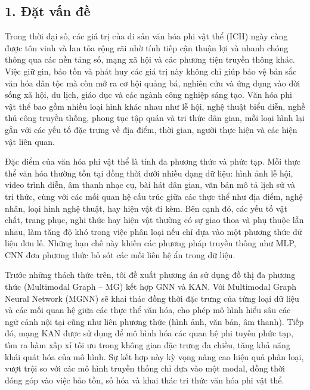 \subsection{1. Đặt vấn đề}

\indent\indent Trong thời đại số, các giá trị của di sản văn hóa phi vật thể (ICH) ngày càng được tôn vinh và lan tỏa rộng rãi nhờ tính tiếp cận thuận lợi và nhanh chóng thông qua các nền tảng số, mạng xã hội và các phương tiện truyền thông khác. Việc giữ gìn, bảo tồn và phát huy các giá trị này không chỉ giúp bảo vệ bản sắc văn hóa dân tộc mà còn mở ra cơ hội quảng bá, 
nghiên cứu và ứng dụng vào đời sống xã hội, du lịch, giáo dục và các ngành công nghiệp sáng tạo. Văn hóa phi vật thể bao gồm nhiều loại hình khác nhau như lễ hội, nghệ thuật biểu diễn, nghề thủ công truyền thống, phong tục tập quán và tri thức dân gian, mỗi loại hình lại gắn với các yếu tố đặc trưng về địa điểm, thời gian, người thực hiện và các hiện vật liên quan.\vspace{0.3cm}

Đặc điểm của văn hóa phi vật thể là tính đa phương thức và phức tạp. Mỗi thực thể văn hóa thường tồn tại đồng thời dưới nhiều dạng dữ liệu: hình ảnh lễ hội, video trình diễn, âm thanh nhạc cụ, bài hát dân gian, văn bản mô tả lịch sử và tri thức, cùng với các mối quan hệ cấu trúc giữa các thực thể như địa điểm, nghệ nhân, loại hình nghệ thuật, hay hiện vật đi kèm. 
Bên cạnh đó, các yếu tố vật chất, trang phục, nghi thức hay hiện vật thường có sự giao thoa và phụ thuộc lẫn nhau, làm tăng độ khó trong việc phân loại nếu chỉ dựa vào một phương thức dữ liệu đơn lẻ. Những hạn chế này khiến các phương pháp truyền thống như MLP, CNN đơn phương thức bỏ sót các mối liên hệ ẩn trong dữ liệu.
\vspace{0.3cm}

Trước những thách thức trên, tôi đề xuất phương án sử dụng đồ thị đa phương thức (Multimodal Graph -- MG) kết hợp GNN và KAN. Với Multimodal Graph Neural Network (MGNN) sẽ khai thác đồng thời đặc trưng của từng loại dữ liệu và các mối quan hệ giữa các thực thể văn hóa, cho phép mô hình hiểu sâu các ngữ cảnh nội tại cũng như liên phương thức (hình ảnh, văn bản, âm thanh). Tiếp đó, mạng KAN được sử dụng để mô hình hóa các quan hệ phi tuyến phức tạp, tìm ra hàm xấp xỉ tối ưu trong không gian đặc trưng đa chiều, tăng khả năng khái quát hóa của mô hình. Sự kết hợp này kỳ vọng nâng cao hiệu quả phân loại, vượt trội so với các mô hình truyền thống chỉ dựa vào một modal, đồng thời đóng góp vào việc bảo tồn, số hóa và khai thác tri thức văn hóa phi vật thể.